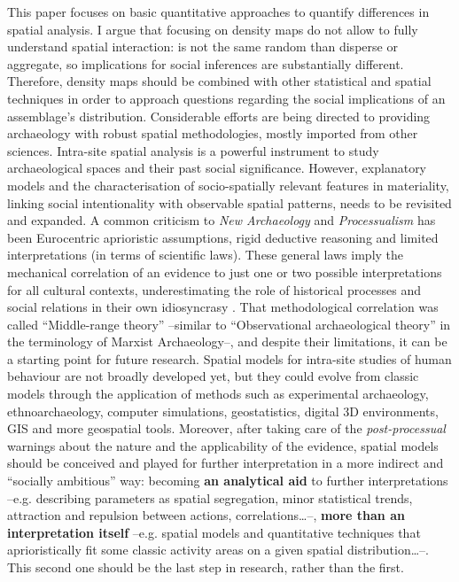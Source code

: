 This paper focuses on basic quantitative approaches to quantify differences in spatial analysis. I argue that focusing on density maps do not allow to fully understand spatial interaction: is not the same random than disperse or aggregate, so implications for social inferences are substantially different. Therefore, density maps should be combined with other statistical and spatial techniques in order to approach questions regarding the social implications of an assemblage’s distribution. Considerable efforts are being directed to providing archaeology with robust spatial methodologies, mostly imported from other sciences. Intra-site spatial analysis is a powerful instrument to study archaeological spaces and their past social significance. However, explanatory models and the characterisation of socio-spatially relevant features in materiality, linking social intentionality with observable spatial patterns, needs to be revisited and expanded. A common criticism to \textit{New Archaeology} and \textit{Processualism} has been Eurocentric aprioristic assumptions, rigid deductive reasoning and limited interpretations (in terms of scientific laws). These general laws imply the mechanical correlation of an evidence to just one or two possible interpretations for all cultural contexts, underestimating the role of historical processes and social relations in their own idiosyncrasy \parencites{Hodder_2003}{Trigger_2006}. That methodological correlation was called “Middle-range theory” –similar to “Observational archaeological theory” in the terminology of Marxist Archaeology–, and despite their limitations, it can be a starting point for future research. Spatial models for intra-site studies of human behaviour are not broadly developed yet, but they could evolve from classic models through the application of methods such as experimental archaeology, ethnoarchaeology, computer simulations, geostatistics, digital 3D environments, GIS and more geospatial tools. Moreover, after taking care of the \textit{post-processual} warnings about the nature and the applicability of the evidence, spatial models should be conceived and played for further interpretation in a more indirect and “socially ambitious” way: becoming \textbf{an analytical aid} to further interpretations –e.g. describing parameters as spatial segregation, minor statistical trends, attraction and repulsion between actions, correlations…–, \textbf{more than an interpretation itself} –e.g. spatial models and quantitative techniques that aprioristically fit some classic activity areas on a given spatial distribution…–. This second one should be the last step in research, rather than the first.

